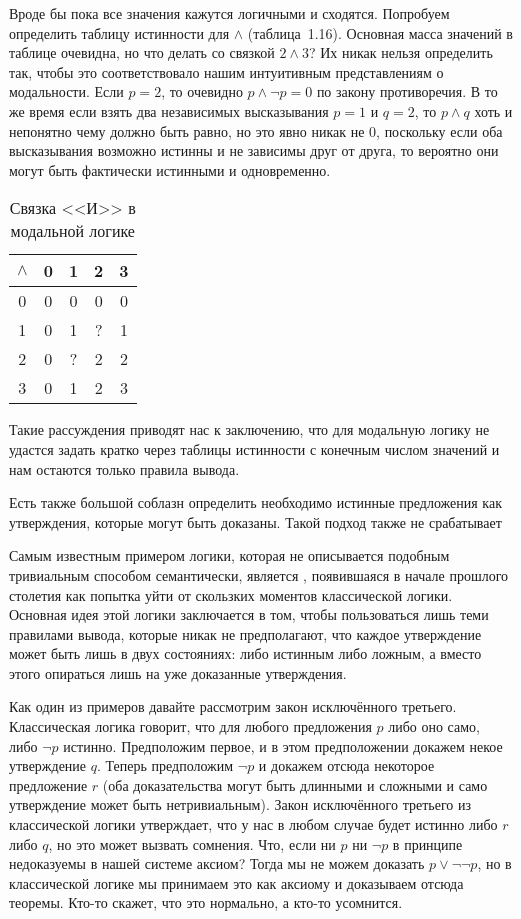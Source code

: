 Вроде бы пока все значения кажутся логичными и сходятся. Попробуем определить таблицу истинности для $\land$ (таблица~1.16). Основная масса значений в таблице очевидна, но что делать со связкой $2\land 3$?  Их никак нельзя определить так, чтобы это соответствовало нашим интуитивным представлениям о модальности. Если $p=2$, то очевидно $p\land\neg p = 0$ по закону противоречия. В то же время если взять два независимых высказывания $p=1$ и $q=2$, то $p\land q$ хоть и непонятно чему должно быть равно, но это явно никак не 0, поскольку если оба высказывания возможно истинны и не зависимы друг от друга, то вероятно они могут быть фактически истинными и одновременно.

\begin{table}[h]
\centering
\begin{tabular}{c | c c c c}
$\land$ & 0 &1 &2 & 3 \\
\hline
0 & 0 & 0 & 0 & 0\\
1 & 0 & 1 & ? & 1\\
2 & 0 & ? & 2 & 2\\
3 & 0 & 1 & 2 & 3
\end{tabular}
\caption{Связка <<И>> в модальной логике}\label{table:kleene-or}
\end{table}

Такие рассуждения приводят нас к заключению, что для модальную логику не удастся задать кратко через таблицы истинности с конечным числом значений и нам остаются только правила вывода.

Есть также большой соблазн определить необходимо истинные предложения как утверждения, которые могут быть доказаны. Такой подход также не срабатывает 


Самым известным примером логики, которая не описывается подобным тривиальным способом семантически, является , появившаяся в начале прошлого столетия как попытка уйти от скользких моментов классической логики. Основная идея этой логики заключается в том, чтобы пользоваться лишь теми правилами вывода, которые никак не предполагают, что каждое утверждение может быть лишь в двух состояниях: либо истинным либо ложным, а вместо этого опираться лишь на уже доказанные утверждения.

Как один из примеров давайте рассмотрим закон исключённого третьего. Классическая логика говорит, что для любого предложения $p$ либо оно само, либо $\neg p$ истинно. Предположим первое, и в этом предположении докажем некое утверждение $q$. Теперь предположим $\neg p$ и докажем отсюда некоторое предложение $r$ (оба доказательства могут быть длинными и сложными и само утверждение может быть нетривиальным). Закон исключённого третьего из классической логики утверждает, что у нас в любом случае будет истинно либо $r$ либо $q$, но это может вызвать сомнения. Что, если ни $p$ ни $\neg p$ в принципе недоказуемы в нашей системе аксиом? Тогда мы не можем доказать $p \lor \neg \neg p$, но в классической логике мы принимаем это как аксиому и доказываем отсюда теоремы. Кто-то скажет, что это нормально, а кто-то усомнится.

